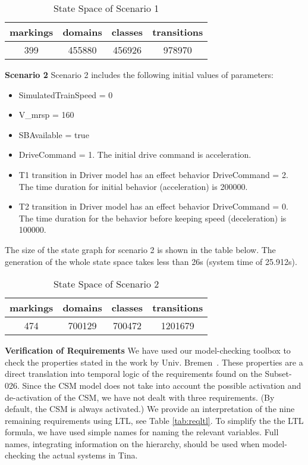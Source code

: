 \begin{table}[ht!]
\footnotesize
\caption{State Space of Scenario 1}
\begin{center}
  \begin{tabular}{|c|c|c|c|}
    \hline
    markings & domains & classes & transitions \\
    \hline
    399 & 455880 & 456926 & 978970 \\ 
    \hline
  \end{tabular}
\end{center}
\end{table}

\textbf{Scenario 2}
Scenario 2 includes the following initial values of parameters:
\begin{itemize}
\item
SimulatedTrainSpeed = 0
\item
V\_mrsp = 160
\item
SBAvailable = true
\item
DriveCommand = 1. The initial drive command is acceleration. 
\item
T1 transition in Driver model has an effect behavior DriveCommand = 2. The time duration for initial behavior (acceleration) is 200000. 
\item
T2 transition in Driver model has an effect behavior DriveCommand = 0. The time duration for the behavior before keeping speed (deceleration) is 100000. 
\end{itemize}

The size of the state graph for scenario 2 is shown in the table
below. The generation of the whole state space takes less than 26s
(system time of 25.912s).


\begin{table}[ht!]
\caption{State Space of Scenario 2}
\footnotesize
\begin{center}
  \begin{tabular}{|c|c|c|c|}
    \hline
    markings & domains & classes & transitions \\
    \hline
    474 & 700129	 & 700472 & 1201679 \\ 
    \hline
  \end{tabular}
\end{center}
\end{table}

\textbf{Verification of Requirements} 
We have used our model-checking toolbox to check the properties stated
in the work by Univ. Bremen~\cite{csmwp4}. These properties are a
direct translation into temporal logic of the requirements found on
the Subset-026. Since the CSM model does not take into
account the possible activation and de-activation of the CSM, we have
not dealt with three requirements. (By default, the CSM is always
activated.) We provide an interpretation of the nine remaining
requirements using LTL, see Table \ref{tab:reqltl}. To simplify the
the LTL formula, we have used simple names for naming the relevant
variables. Full names, integrating information on the hierarchy,
should be used when model-checking the actual systems in Tina.


